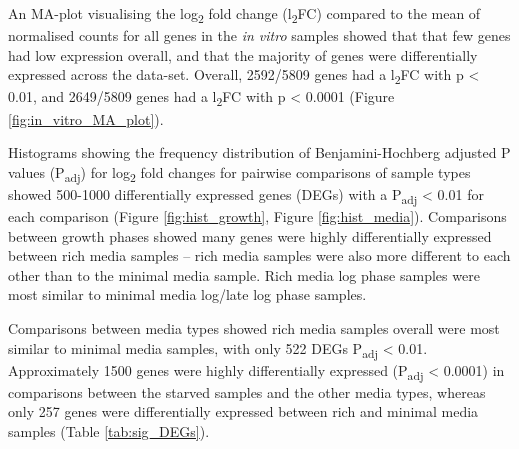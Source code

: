 An MA-plot visualising the log\textsubscript{2} fold change (l\textsubscript{2}FC) compared to the mean of normalised counts for all genes in the \textit{in vitro} samples showed that that few genes had low expression overall, and that the majority of genes were differentially expressed across the data-set. Overall, 2592/5809 genes had a l\textsubscript{2}FC with p < 0.01, and 2649/5809 genes had a l\textsubscript{2}FC with p < 0.0001 (Figure \ref{fig:in_vitro_MA_plot}).

Histograms showing the frequency distribution of Benjamini-Hochberg adjusted P values (P\textsubscript{adj}) for log\textsubscript{2} fold changes for pairwise comparisons of sample types showed 500-1000 differentially expressed genes (DEGs) with a P\textsubscript{adj} < 0.01 for each comparison (Figure \ref{fig:hist_growth}, Figure \ref{fig:hist_media}). Comparisons between growth phases showed many genes were highly differentially expressed between rich media samples -- rich media samples were also more different to each other than to the minimal media sample. Rich media log phase samples were most similar to minimal media log/late log phase samples.

Comparisons between media types showed rich media samples overall were most similar to minimal media samples, with only 522 DEGs P\textsubscript{adj} < 0.01. Approximately 1500 genes were highly differentially expressed (P\textsubscript{adj} < 0.0001) in comparisons between the starved samples and the other media types, whereas only 257 genes were differentially expressed between rich and minimal media samples (Table \ref{tab:sig_DEGs}).

